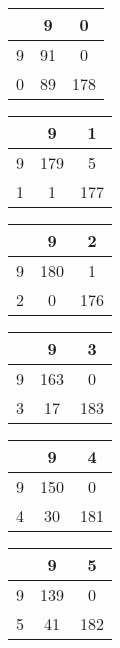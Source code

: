 \documentclass[12pt]{article}
\begin{document}
		\begin{multicols}{3}
			\begin{tabular}{| c | c | c |}
				\hline
				& 9 & 0 \\ 
				\hline
				9 & 91 & 0 \\ 
				\hline
				0 & 89 & 178 \\ 
				\hline
			\end{tabular}
			\newline


			\begin{tabular}{| c | c | c |}
				\hline
				& 9 & 1 \\ 
				\hline
				9 & 179 & 5 \\ 
				\hline
				1 & 1 & 177 \\ 
				\hline
			\end{tabular}
			\newline


			\begin{tabular}{| c | c | c |}
				\hline
				& 9 & 2 \\ 
				\hline
				9 & 180 & 1 \\ 
				\hline
				2 & 0 & 176 \\ 
				\hline
			\end{tabular}
			\newline


			\begin{tabular}{| c | c | c |}
				\hline
				& 9 & 3 \\ 
				\hline
				9 & 163 & 0 \\ 
				\hline
				3 & 17 & 183 \\ 
				\hline
			\end{tabular}
			\newline


			\begin{tabular}{| c | c | c |}
				\hline
				& 9 & 4 \\ 
				\hline
				9 & 150 & 0 \\ 
				\hline
				4 & 30 & 181 \\ 
				\hline
			\end{tabular}
			\newline


			\begin{tabular}{| c | c | c |}
				\hline
				& 9 & 5 \\ 
				\hline
				9 & 139 & 0 \\ 
				\hline
				5 & 41 & 182 \\ 
				\hline
			\end{tabular}
			\newline



\end{multicols}
\end{document}
